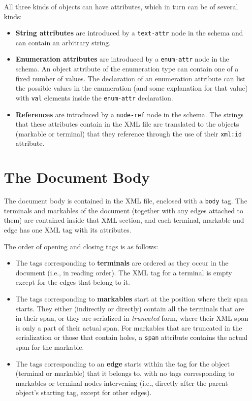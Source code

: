 \documentclass[a4paper,11pt]{report}
\begin{document}
All three kinds of objects can have attributes, which in turn can be of
several kinds:
\begin{itemize}
\item \textbf{String attributes} are introduced by a \texttt{text-attr}
node in the schema and can contain an arbitrary string.
\item \textbf{Enumeration attributes} are introduced by a \texttt{enum-attr}
node in the schema. An object attribute of the enumeration type can contain
one of a fixed number of values. The declaration of an enumeration attribute
can list the possible values in the enumeration (and some explanation for
that value) with \texttt{val} elements inside the \texttt{enum-attr} declaration.
\item \textbf{References} are introduced by a \texttt{node-ref} node in the schema.
The strings that these attributes contain in the XML file are translated to the
objects (markable or terminal) that they reference through the use of their \texttt{xml:id}
attribute.
\end{itemize}

\section{The Document Body}
The document body is contained in the XML file, enclosed with a \texttt{body} tag.
The terminals and markables of the document (together with any edges attached to them)
are contained inside that XML section, and each terminal, markable and edge
has one XML tag with its attributes.

The order of opening and closing tags is as follows:
\begin{itemize}
\item The tags corresponding to \textbf{terminals} are ordered
as they occur in the document (i.e., in reading order). The XML
tag for a terminal is empty except for the edges that belong to it.
\item The tags corresponding to \textbf{markables} start at the
position where their span starts. They either (indirectly or directly)
contain all the terminals that are in their span, or they are serialized
in \emph{truncated} form, where their XML span is only a part of their actual
span. For markables that are truncated in the serialization or those
that contain holes, a \texttt{span} attribute contains the actual span
for the markable.
\item The tags corresponding to an \textbf{edge} starts within the tag for the
object (terminal or markable) that it belongs to, with no tags corresponding
to markables or terminal nodes intervening (i.e., directly after the parent
object's starting tag, except for other edges).
\end{itemize}
\end{document}
